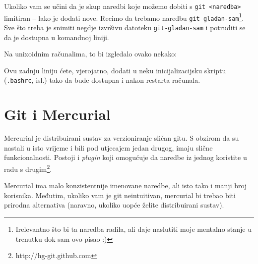 Ukoliko vam se učini da je skup naredbi koje možemo dobiti s \verb+git <naredba>+ limitiran -- lako je dodati nove.
Recimo da trebamo naredbu \verb+git gladan-sam+\footnote{Irelevantno što bi ta naredba radila, ali daje naslutiti moje mentalno stanje u trenutku dok sam ovo pisao :)}.
Sve što treba je snimiti negdje izvršivu datoteku \verb+git-gladan-sam+ i potruditi se da je dostupna u komandnoj liniji.

Na unixoidnim računalima, to bi izgledalo ovako nekako:


Ovu zadnju liniju ćete, vjerojatno, dodati u neku inicijalizacijsku skriptu (\verb+.bashrc+, isl.) tako da bude dostupna i nakon restarta računala.

%
%
%

%

\section*{Git i Mercurial}

Mercurial je distribuirani sustav za verzioniranje sličan gitu.
S obzirom da su nastali u isto vrijeme i bili pod utjecajem jedan drugog, imaju slične funkcionalnosti.
Postoji i \emph{plugin} koji omogućuje da naredbe iz jednog koristite u radu s drugim\footnote{http://hg-git.github.com}.

Mercurial ima malo konzistentnije imenovane naredbe, ali isto tako i manji broj korisnika.
Međutim, ukoliko vam je git neintuitivan, mercurial bi trebao biti prirodna alternativa (naravno, ukoliko uopće želite distribuirani sustav).

